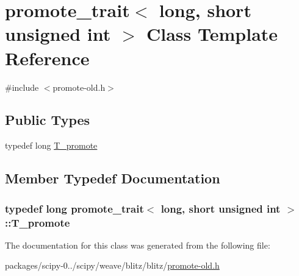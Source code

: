 \hypertarget{classpromote__trait_3_01long_00_01short_01unsigned_01int_01_4}{}\section{promote\+\_\+trait$<$ long, short unsigned int $>$ Class Template Reference}
\label{classpromote__trait_3_01long_00_01short_01unsigned_01int_01_4}


{\ttfamily \#include $<$promote-\/old.\+h$>$}

\subsection*{Public Types}
\begin{DoxyCompactItemize}
\item 
typedef long \hyperlink{classpromote__trait_3_01long_00_01short_01unsigned_01int_01_4_a74242b061ebf305f108cbacd5abe811d}{T\+\_\+promote}
\end{DoxyCompactItemize}


\subsection{Member Typedef Documentation}
\hypertarget{classpromote__trait_3_01long_00_01short_01unsigned_01int_01_4_a74242b061ebf305f108cbacd5abe811d}{}
\subsubsection[{T\+\_\+promote}]{\setlength{\rightskip}{0pt plus 5cm}typedef long {\bf promote\+\_\+trait}$<$ long, short unsigned int $>$\+::{\bf T\+\_\+promote}}\label{classpromote__trait_3_01long_00_01short_01unsigned_01int_01_4_a74242b061ebf305f108cbacd5abe811d}


The documentation for this class was generated from the following file\+:\begin{DoxyCompactItemize}
\item 
packages/scipy-\/0../scipy/weave/blitz/blitz/\hyperlink{promote-old_8h}{promote-\/old.\+h}\end{DoxyCompactItemize}
